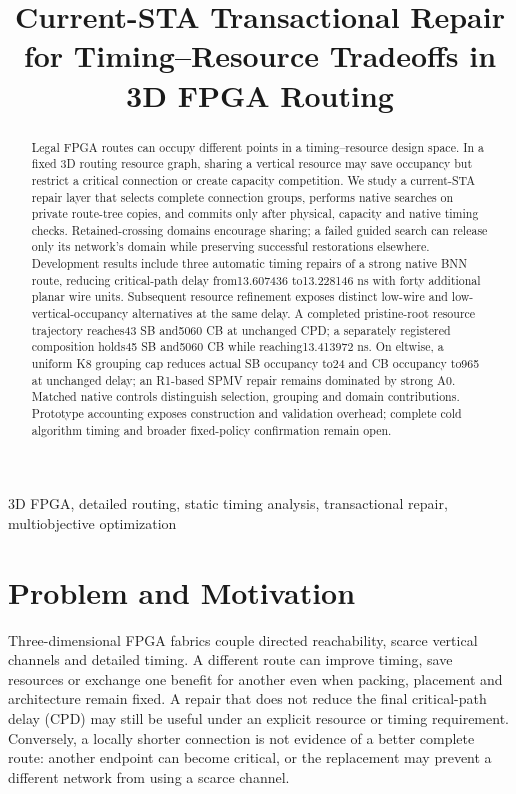 \documentclass[conference,10pt]{IEEEtran}
\title{Current-STA Transactional Repair for Timing--Resource Tradeoffs in 3D FPGA Routing}
\author{\IEEEauthorblockN{Anonymous development manuscript}}
\begin{document}
\maketitle
\begin{abstract}
Legal FPGA routes can occupy different points in a timing--resource design space. In a fixed 3D routing resource graph, sharing a vertical resource may save occupancy but restrict a critical connection or create capacity competition. We study a current-STA repair layer that selects complete connection groups, performs native searches on private route-tree copies, and commits only after physical, capacity and native timing checks. Retained-crossing domains encourage sharing; a failed guided search can release only its network's domain while preserving successful restorations elsewhere. Development results include three automatic timing repairs of a strong native BNN route, reducing critical-path delay from13.607436 to13.228146 ns with forty additional planar wire units. Subsequent resource refinement exposes distinct low-wire and low-vertical-occupancy alternatives at the same delay. A completed pristine-root resource trajectory reaches43 SB and5060 CB at unchanged CPD; a separately registered composition holds45 SB and5060 CB while reaching13.413972 ns. On eltwise, a uniform K8 grouping cap reduces actual SB occupancy to24 and CB occupancy to965 at unchanged delay; an R1-based SPMV repair remains dominated by strong A0. Matched native controls distinguish selection, grouping and domain contributions. Prototype accounting exposes construction and validation overhead; complete cold algorithm timing and broader fixed-policy confirmation remain open.
\end{abstract}
\begin{IEEEkeywords}
3D FPGA, detailed routing, static timing analysis, transactional repair, multiobjective optimization
\end{IEEEkeywords}

\section{Problem and Motivation}
Three-dimensional FPGA fabrics couple directed reachability, scarce vertical channels and detailed timing. A different route can improve timing, save resources or exchange one benefit for another even when packing, placement and architecture remain fixed. A repair that does not reduce the final critical-path delay (CPD) may still be useful under an explicit resource or timing requirement. Conversely, a locally shorter connection is not evidence of a better complete route: another endpoint can become critical, or the replacement may prevent a different network from using a scarce channel.
\end{document}
